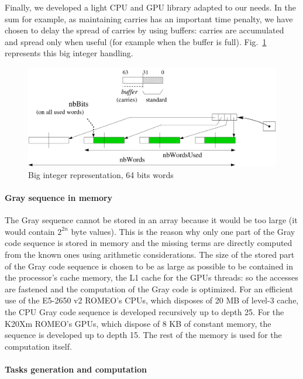 Finally, we developed a light CPU and GPU library adapted to our needs.
In the sum for example, as maintaining carries has an important time penalty, we have chosen to delay the spread of carries by using buffers: carries are accumulated and spread only when useful (for example when the buffer is full).
Fig.~\ref{fig:big-integer} represents this big integer handling.
\begin{figure}[htbp]
\centering
\includegraphics[scale=.5]{figures/langford/lgf_grands_entiers}
\caption{Big integer representation, 64 bits words}
\label{fig:big-integer}
\end{figure}


\paragraph{Gray sequence in memory}
The Gray sequence cannot be stored in an array because it would be too large (it would contain $2^{2n}$ byte values). This is the reason why only one part of the Gray code sequence is stored in memory and the missing terms are directly computed from the known ones using arithmetic considerations.
The size of the stored part of the Gray code sequence is chosen to be as large as possible to be contained in the processor's cache memory, the L1 cache for the GPUs threads: so the accesses are fastened and the computation of the Gray code is optimized.
For an efficient use of the E5-2650 v2 ROMEO's CPUs, which disposes of 20 MB of level-3 cache, the CPU Gray code sequence is developed recursively up to depth 25. For the K20Xm ROMEO's GPUs, which dispose of 8 KB of constant memory, the sequence is developed up to depth 15. The rest of the memory is used for the computation itself. 

\paragraph{Tasks generation and computation}
\label{sec:tasks}

